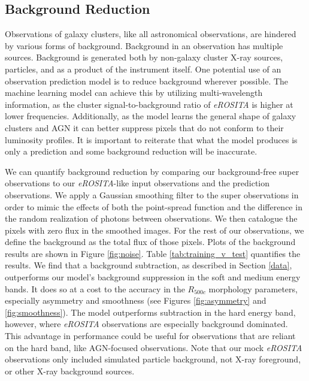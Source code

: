 \documentclass[twocolumn, 11pt]{aastex63}%
\begin{document}
\subsection{Background Reduction}\label{background reduction}
Observations of galaxy clusters, like all astronomical observations, are hindered by various forms of background. Background in an observation has multiple sources. Background is generated both by non-galaxy cluster X-ray sources, particles, and as a product of the instrument itself. One potential use of an observation prediction model is to reduce background wherever possible. The machine learning model can achieve this by utilizing multi-wavelength information, as the cluster signal-to-background ratio of \textit{eROSITA} is higher at lower frequencies. Additionally, as the model learns the general shape of galaxy clusters and AGN it can better suppress pixels that do not conform to their luminosity profiles. It is important to reiterate that what the model produces is only a prediction and some background reduction will be inaccurate.

We can quantify background reduction by comparing our background-free super observations to our \textit{eROSITA}-like input observations and the prediction observations. We apply a Gaussian smoothing filter to the super observations in order to mimic the effects of both the point-spread function and the difference in the random realization of photons between observations. We then catalogue the pixels with zero flux in the smoothed images. For the rest of our observations, we define the background as the total flux of those pixels. Plots of the background results are shown in Figure \ref{fig:noise}. Table \ref{tab:training_v_test} quantifies the results. 
We find that a background subtraction, as described in Section \ref{data}, outperforms our model's background suppression in the soft and medium energy bands. It does so at a cost to the accuracy in the $R_{500c}$ morphology parameters, especially asymmetry and smoothness (see Figures \ref{fig:asymmetry} and \ref{fig:smoothness}). The model outperforms subtraction in the hard energy band, however, where \textit{eROSITA} observations are especially background dominated. This advantage in performance could be useful for observations that are reliant on the hard band, like AGN-focused observations. Note that our mock \textit{eROSITA} observations only included simulated particle background, not X-ray foreground, or other X-ray background sources.
\end{document}
